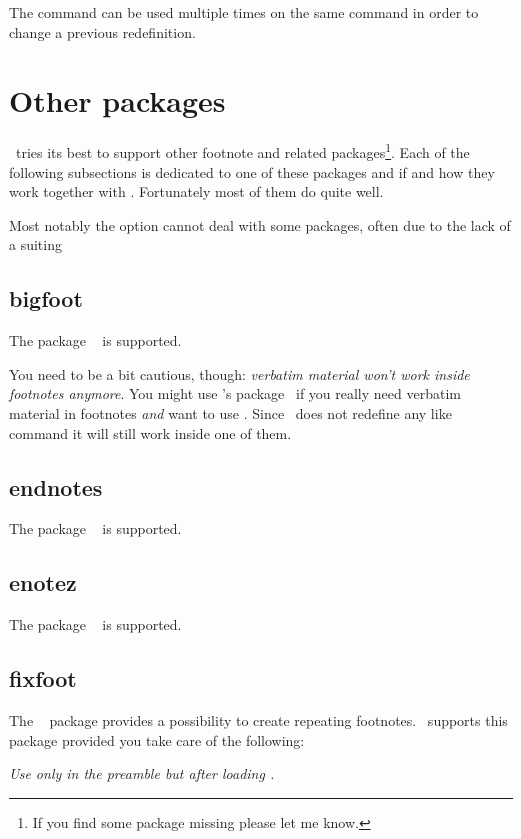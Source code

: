 \documentclass{fnpct-manual}
\begin{document}
The command  can be used multiple times on the same command in
order to change a previous redefinition.

\section{Other packages}\label{sec:other:packages}
\fnpct\ tries its best to support other footnote and related
packages\footnote{If you find some package missing please let me know.}.  Each
of the following subsections is dedicated to one of these packages and if and
how they work together with \fnpct.  Fortunately most of them do quite well.

Most notably the  option cannot deal with some packages, often
due to the lack of a suiting  

\subsection{bigfoot}\label{sec:bigfoot}
The package ~\cite{pkg:bigfoot} is supported.

You need to be a bit cautious, though: \emph{verbatim material won't work
  inside footnotes anymore}.  You might use \lefloch's 
package~\cite{pkg:cprotect} if you really need verbatim material in footnotes
\emph{and} want to use \fnpct.  Since \fnpct\ does not redefine any
 like command it will still work inside one of them.

\subsection{endnotes}\label{sec:endnotes}
The package ~\cite{pkg:endnotes} is supported.

\subsection{enotez}\label{sec:enotez}
The package ~\cite{pkg:enotez} is supported.

\subsection{fixfoot}\label{sec:fixfoot}
The ~\cite{pkg:fixfoot} package provides a possibility to create
repeating footnotes.  \fnpct\ supports this package provided you take care of
the following:

\emph{Use  only in the preamble but \emph{after}
  loading \fnpct.}
\end{document}
